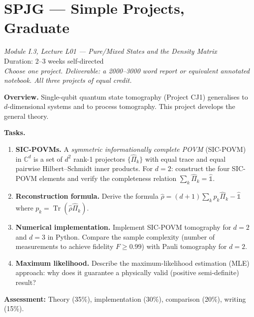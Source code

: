 \documentclass[11pt,a4paper]{article}
\begin{document}
\section*{SPJG --- Simple Projects, Graduate}
\begin{center}
  \textit{Module I.3, Lecture L01 --- Pure/Mixed States and the Density Matrix}\\[4pt]
  \quad{}
  \qquad Duration: 2--3 weeks self-directed\\[6pt]
  \textit{Choose one project. Deliverable: a 2000--3000 word report or equivalent
  annotated notebook. All three projects of equal credit.}
\end{center}

\bigskip

\begin{tcolorbox}[gradprobbox, title={Project SG1 --- Quantum Tomography Beyond Qubits}]

\textbf{Overview.}
Single-qubit quantum state tomography (Project CJ1) generalises to $d$-dimensional
systems and to process tomography. This project develops the general theory.

\medskip\textbf{Tasks.}
\begin{enumerate}[leftmargin=1.8em, label=\textbf{\arabic*.}, itemsep=6pt]
  \item \textbf{SIC-POVMs.}
        A \emph{symmetric informationally complete POVM} (SIC-POVM) in $\mathbb{C}^d$
        is a set of $d^2$ rank-1 projectors $\{\hat{\Pi}_k\}$ with equal trace
        and equal pairwise Hilbert--Schmidt inner products.
        For $d=2$: construct the four SIC-POVM elements and verify the
        completeness relation $\sum_k\hat{\Pi}_k=\hat{\mathbb{1}}$.
  \item \textbf{Reconstruction formula.}
        Derive the formula $\hat{\rho}=(d+1)\sum_k p_k\hat{\Pi}_k-\hat{\mathbb{1}}$
        where $p_k=\operatorname{Tr}(\hat{\rho}\hat{\Pi}_k)$.
  \item \textbf{Numerical implementation.}
        Implement SIC-POVM tomography for $d=2$ and $d=3$ in Python.
        Compare the sample complexity (number of measurements to achieve
        fidelity $F\ge 0.99$) with Pauli tomography for $d=2$.
  \item \textbf{Maximum likelihood.}
        Describe the maximum-likelihood estimation (MLE) approach:
        why does it guarantee a physically valid (positive semi-definite) result?
\end{enumerate}

\medskip\textbf{Assessment:} Theory (35\%), implementation (30\%), comparison (20\%), writing (15\%).
\end{tcolorbox}
\end{document}
